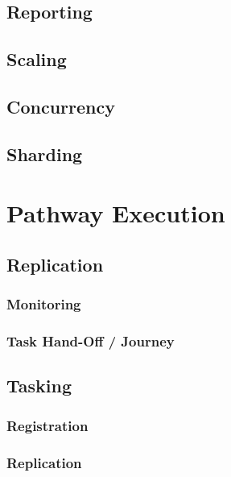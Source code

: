 \documentclass[a4paper]{book}
\begin{document}
\subsection{Reporting}
\label{feature:petasos.oam.reporting}

\subsection{Scaling}
\label{feature:petasos.scaling}
\subsection{Concurrency}
\label{feature:petasos.scaling.concurrency}

\subsection{Sharding}
\label{feature:petasos.scaling.sharding}

\section{Pathway Execution}
\label{feature:petasos.pathway}

\subsection{Replication}
\label{feature:petasos.pathway.replication}
\subsubsection{Monitoring}
\label{feature:petasos.pathway.monitoring}
\subsubsection{Task Hand-Off / Journey}
\label{feature:petasos.pathway.handoff}

\subsection{Tasking}
\label{feature:petasos.tasking}
\subsubsection{Registration}
\label{feature:petasos.tasking.registration}
\subsubsection{Replication}
\end{document}

